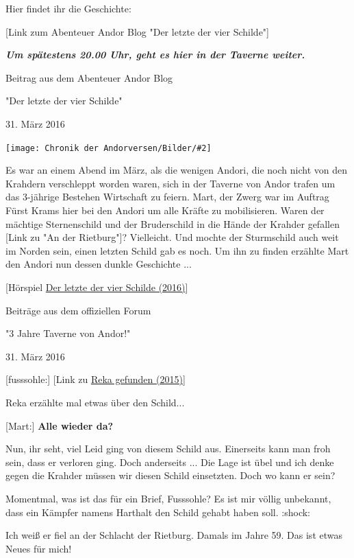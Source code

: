 \documentclass[10pt, a4paper, oneside]{book}
\newcommand{\refstorytext}[1]{\hyperref[Storytext: #1]{#1}}
\newcommand{\bildmitts}[2][height=0.32\textwidth,width=0.48\textwidth,keepaspectratio]{%
    \begin{center}
        \texttt{[image: Chronik der Andorversen/Bilder/\#2]}
    \end{center}
}
\begin{document}
\begin{multicols}{2}
Hier findet ihr die Geschichte:

[Link zum Abenteuer Andor Blog "Der letzte der vier Schilde"]

\textit{\textbf{Um spätestens 20.00 Uhr, geht es hier in der Taverne weiter.}}

\begin{center}
    Beitrag aus dem Abenteuer Andor Blog

    "Der letzte der vier Schilde"

    31. März 2016
\end{center}

\bildmitts{AA2016 Blog 5.jpeg}

Es war an einem Abend im März, als die wenigen Andori, die noch nicht von den Krahdern verschleppt worden waren, sich in der Taverne von Andor trafen um das 3-jährige Bestehen Wirtschaft zu feiern. Mart, der Zwerg war im Auftrag Fürst Krams hier bei den Andori um alle Kräfte zu mobilisieren. Waren der mächtige Sternenschild und der Bruderschild in die Hände der Krahder gefallen [Link zu "An der Rietburg"]? Vielleicht. Und mochte der Sturmschild auch weit im Norden sein, einen letzten Schild gab es noch. Um ihn zu finden erzählte Mart den Andori nun dessen dunkle Geschichte ...

[Hörspiel \refstorytext{Der letzte der vier Schilde (2016)}]


\begin{center}
    Beiträge aus dem offiziellen Forum

    "3 Jahre Taverne von Andor!"

    31. März 2016
\end{center}




[fusssohle:] [Link zu \refstorytext{Reka gefunden (2015)}]

Reka erzählte mal etwas über den Schild...

[Mart:] \textbf{Alle wieder da?}

Nun, ihr seht, viel Leid ging von diesem Schild aus. Einerseits kann man froh sein, dass er verloren ging. Doch anderseits ... Die Lage ist übel und ich denke gegen die Krahder müssen wir diesen Schild einsetzten. Doch wo kann er sein?

Momentmal, was ist das für ein Brief, Fusssohle? Es ist mir völlig unbekannt, dass ein Kämpfer namens Harthalt den Schild gehabt haben soll. :shock:

Ich weiß er fiel an der Schlacht der Rietburg. Damals im Jahre 59. Das ist etwas Neues für mich!


\end{multicols}
\end{document}
